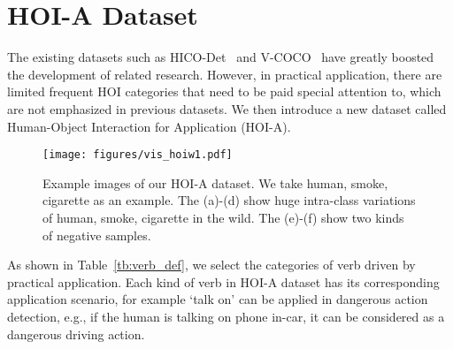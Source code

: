 \documentclass[10pt,twocolumn,letterpaper]{article}
\begin{document}
\section{HOI-A Dataset}
The existing datasets such as HICO-Det~\cite{qi2018learning} and V-COCO~\cite{gupta2015visual} have greatly boosted the development of related research. 
However, in practical application, there are limited frequent HOI categories that need to be paid special attention to, which are not emphasized in previous datasets. We then introduce a new dataset called Human-Object Interaction for Application (HOI-A).
\begin{figure}[htb]
\vspace{-2mm}
  \centering
  \texttt{[image: figures/vis\_hoiw1.pdf]}
  \vspace{-1mm}
  \caption{Example images of our HOI-A dataset. We take human, smoke, cigarette as an example. The (a)-(d) show huge intra-class variations of human, smoke, cigarette in the wild. The (e)-(f) show two kinds of negative samples. }
  \label{hoiw_view}
    \vspace{-2mm}
\end{figure}



As shown in Table~\ref{tb:verb_def}, we select the categories of verb driven by practical application. Each kind of verb in HOI-A dataset has its corresponding application scenario, for example `talk on' can be applied in dangerous action detection, e.g., if the human is talking on phone in-car, it can be considered as a dangerous driving action.
\end{document}
